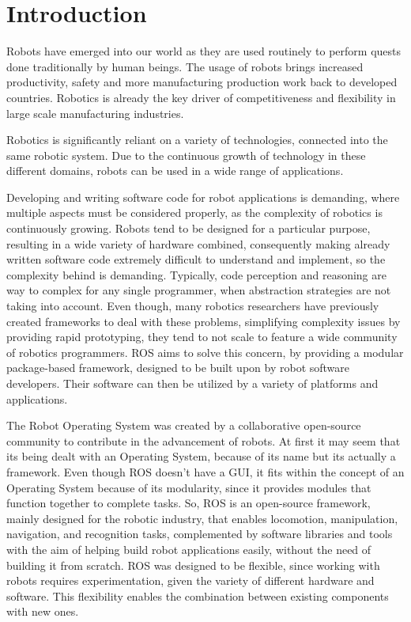\section{Introduction}\label{c:intro}

Robots have emerged into our world as they are used routinely to perform quests done traditionally by human beings. The usage of robots brings increased productivity, safety and more manufacturing production work back to developed countries. Robotics is already the key driver of competitiveness and flexibility in large scale manufacturing industries. 

Robotics is significantly reliant on a variety of technologies, connected into the same robotic system. Due to the continuous growth of technology in these different domains, robots can be used in a wide range of applications. \cite{mohamed2008middleware}

Developing and writing software code for robot applications is demanding, where multiple aspects must be considered properly, as the complexity of robotics is continuously growing. Robots tend to be designed for a particular purpose, resulting in a wide variety of hardware combined, consequently making already written software code extremely difficult to understand and implement, so the complexity behind is demanding. Typically, code perception and reasoning are way to complex for any single programmer, when abstraction strategies are not taking into account. Even though, many robotics researchers have previously created frameworks to deal with these problems, simplifying complexity issues by providing rapid prototyping, they tend to not scale to feature a wide community of robotics programmers. ROS aims to solve this concern, by providing a modular package-based framework, designed to be built upon by robot software developers. Their software can then be utilized by a variety of platforms and applications. \cite{intro-ros}

The Robot Operating System was created by a collaborative open-source community to contribute in the advancement of robots. \cite{diluoffo2018robot} At first it may seem that its being dealt with an Operating System, because of its name but its actually a framework. Even though ROS doesn't have a GUI, it fits within the concept of an Operating System because of its modularity, since it provides modules that function together to complete tasks. So, ROS is an open-source framework, mainly designed for the robotic industry, that enables locomotion, manipulation, navigation, and recognition tasks, complemented by software libraries and tools with the aim of helping build robot applications easily, without the need of building it from scratch. ROS was designed to be flexible, since working with robots requires experimentation, given the variety of different hardware and software. This flexibility enables the combination between existing components with new ones. 


